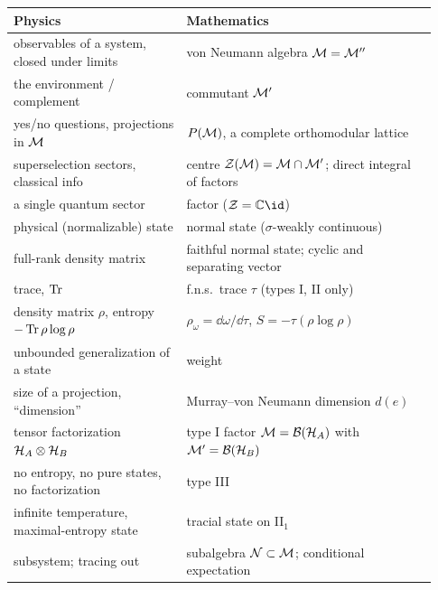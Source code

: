 \begin{dictbox}
\renewcommand{\arraystretch}{1.3}
\begin{tabular}{@{}p{0.38\linewidth}p{0.55\linewidth}@{}}
\textbf{Physics} & \textbf{Mathematics}\\
\hline
observables of a system, closed under limits & von Neumann algebra $\mathcal{M}=\mathcal{M}''$\\
the environment / complement & commutant $\mathcal{M}'$\\
yes/no questions, projections in $\mathcal{M}$ & $P(\mathcal{M})$, a complete orthomodular lattice\\
superselection sectors, classical info & centre $\mathcal{Z}(\mathcal{M})=\mathcal{M}\cap\mathcal{M}'$; direct integral of factors\\
a single quantum sector & factor ($\cZ=\C\id$)\\
physical (normalizable) state & normal state ($\sigma$-weakly continuous)\\
full-rank density matrix & faithful normal state; cyclic and separating vector\\
trace, $\operatorname{Tr}$ & f.n.s.\ trace $\tau$ (types I, II only)\\
density matrix $\rho$, entropy $-\operatorname{Tr}\rho\log\rho$ & $\rho_\omega=\dd\omega/\dd\tau$, $S=-\tau(\rho\log\rho)$\\
unbounded generalization of a state & weight\\
size of a projection, ``dimension'' & Murray--von Neumann dimension $d(e)$\\
tensor factorization $\mathcal{H}_A\otimes\mathcal{H}_B$ & type I factor $\mathcal{M}=\mathcal{B}(\mathcal{H}_A)$ with $\mathcal{M}'=\mathcal{B}(\mathcal{H}_B)$\\
no entropy, no pure states, no factorization & type III\\
infinite temperature, maximal-entropy state & tracial state on II$_1$\\
subsystem; tracing out & subalgebra $\mathcal{N}\subset\mathcal{M}$; conditional expectation\\
\end{tabular}
\end{dictbox}
